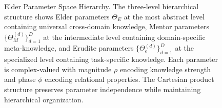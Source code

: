 \begin{figure}[ht]

\caption{Elder Parameter Space Hierarchy. The three-level hierarchical structure shows Elder parameters $\Theta_E$ at the most abstract level containing universal cross-domain knowledge, Mentor parameters $\{\Theta_M^{(d)}\}_{d=1}^D$ at the intermediate level containing domain-specific meta-knowledge, and Erudite parameters $\{\Theta_e^{(d)}\}_{d=1}^D$ at the specialized level containing task-specific knowledge. Each parameter is complex-valued with magnitude $\rho$ encoding knowledge strength and phase $\phi$ encoding relational properties. The Cartesian product structure preserves parameter independence while maintaining hierarchical organization.}
\label{fig:elder_parameter_hierarchy}
\end{figure}